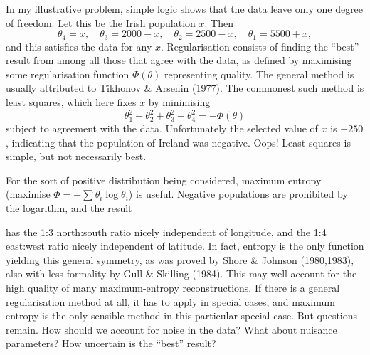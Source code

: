 \bigskip
{}
\smallskip

In my illustrative problem, simple logic shows that the data leave only one degree of freedom. 
Let this be the Irish population $x$.  
Then
$$
  \theta_4 = x,\quad \theta_3 = 2000-x,
  \quad \theta_2 = 2500-x,\quad \theta_1 = 5500+x,
$$
and this satisfies the data for any $x$.  
Regularisation consists of finding the ``best'' result from among all those that agree with the data, 
as defined by maximising some regularisation function $\Phi(\theta)$ representing quality. 
The general method is usually attributed to Tikhonov \& Arsenin (1977). 
The commonest such method is least squares, which here fixes $x$ by minimising 
$$
  \theta_1^2 + \theta_2^2 + \theta_3^2 + \theta_4^2 = -\Phi(\theta)
$$
subject to agreement with the data.  
Unfortunately the selected value of $x$ is $-250$, indicating that the population of Ireland was negative.
Oops!  Least squares is simple, but not necessarily best.

For the sort of positive distribution being considered, maximum entropy (maximise $ \Phi = -\sum \theta_i \log\theta_i $) is useful.  
Negative populations are prohibited by the logarithm, and the result

\centerline{\vbox{\vskip 4pt
\offinterlineskip
       } }
\noindent
has the 1:3 north:south ratio nicely independent of longitude, and the 1:4 east:west ratio nicely independent of latitude.  
In fact, entropy is the only function yielding this general symmetry, as was proved by Shore \& Johnson (1980,1983), also with less formality by Gull \& Skilling (1984).
This may well account for the high quality of many maximum-entropy reconstructions.
If there is a general regularisation method at all, it has to apply in special cases, and maximum entropy is the only sensible method in this particular special case.
But questions remain.  How should we account for noise in the data?
What about nuisance parameters?  How uncertain is the ``best'' result?

